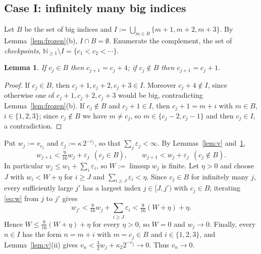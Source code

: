 \documentclass[11pt]{amsart}
\newtheorem{lemma}{Lemma}[section]
\theoremstyle{definition}
\theoremstyle{remark}
\newcommand{\N}{\mathbb{N}}
\begin{document}
\subsection{Case I: infinitely many big indices}
Let $B$ be the set of big indices and
$I:=\bigcup_{m\in B}\{m+1,m+2,m+3\}$. By Lemma~\ref{lem:frozen}(b), $I\cap B=\emptyset$.
Enumerate the complement, the set of \emph{checkpoints},
$\N_{\ge1}\setminus I=\{c_1<c_2<\cdots\}$.

\begin{lemma}\label{lem:checkpoints}
If $c_j\in B$ then $c_{j+1}=c_j+4$; if $c_j\notin B$ then $c_{j+1}=c_j+1$.
\end{lemma}

\begin{proof}
If $c_j\in B$, then $c_j+1,c_j+2,c_j+3\in I$. Moreover $c_j+4\notin I$, since otherwise
one of $c_j+1,c_j+2,c_j+3$ would be big, contradicting Lemma~\ref{lem:frozen}(b).
If $c_j\notin B$ and $c_j+1\in I$, then $c_j+1=m+i$ with $m\in B$, $i\in\{1,2,3\}$;
since $c_j\notin B$ we have $m\ne c_j$, so $m\in\{c_j-2,c_j-1\}$ and then $c_j\in I$,
a contradiction.
\end{proof}

Put $w_j:=v_{c_j}$ and $\varepsilon_j:=\kappa\,2^{-c_j}$, so that
$\sum_j\varepsilon_j<\infty$. By Lemmas~\ref{lem:v} and~\ref{lem:checkpoints},
\begin{equation}\label{eq:w}
w_{j+1}<\tfrac9{16}w_j+\varepsilon_j\ \ (c_j\in B),\qquad
w_{j+1}<w_j+\varepsilon_j\ \ (c_j\notin B).
\end{equation}
In particular $w_j\le w_1+\sum_i\varepsilon_i$, so $W:=\limsup w_j$ is finite. Let
$\eta>0$ and choose $J$ with $w_i<W+\eta$ for $i\ge J$ and $\sum_{i\ge J}\varepsilon_i<\eta$.
Since $c_j\in B$ for infinitely many $j$, every sufficiently large $j'$ has a largest
index $j\in[J,j')$ with $c_j\in B$; iterating \eqref{eq:w} from $j$ to $j'$ gives
\[
w_{j'}<\tfrac9{16}w_j+\sum_{i\ge J}\varepsilon_i<\tfrac9{16}(W+\eta)+\eta .
\]
Hence $W\le\tfrac9{16}(W+\eta)+\eta$ for every $\eta>0$, so $W=0$ and $w_j\to0$.
Finally, every $n\in I$ has the form $n=m+i$ with $m=c_j\in B$ and $i\in\{1,2,3\}$, and
Lemma~\ref{lem:v}(ii) gives $v_n<\tfrac32w_j+\kappa_2 2^{-c_j}\to0$. Thus
$v_n\to0$.
\end{document}
